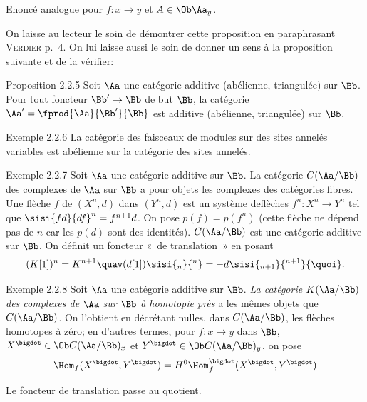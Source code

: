 \documentclass[10pt]{../fichiers-configuration-latex/smfart}
\begin{document}
Enoncé analogue pour $f:x\rightarrow y$ et $A\in \Ob \Aa_y$.

On laisse au lecteur le soin de démontrer cette proposition en
paraphrasant \textsc{Verdier} \cite{SGA4-17:CD} p.~4. On lui laisse aussi le soin de donner
un sens à la proposition suivante et de la vérifier:

\begin{enonce*}{Proposition 2.2.5}
Soit $\Aa$ une catégorie additive (\resp abélienne, \resp
triangulée) sur $\Bb$. Pour tout foncteur
$\Bb'\rightarrow \Bb$ de but $\Bb$, la
catégorie $\Aa'=\fprod{\Aa}{\Bb'}{\Bb}$ est
additive (\resp abélienne, \resp triangulée) sur $\Bb$.
\end{enonce*}

\begin{enonce*}[remark]{Exemple 2.2.6}
La catégorie des faisceaux de modules sur des sites annelés variables
est abélienne sur la catégorie des sites annelés.
\end{enonce*}

\begin{enonce*}[remark]{Exemple 2.2.7}
Soit $\Aa$ une catégorie additive sur $\Bb$. La
catégorie $C(\Aa/\Bb)$ des complexes de $\Aa$
sur $\Bb$ a pour objets les complexes des catégories
fibres. Une flèche $f$ de $(X^n,d)$ dans $(Y^n,d)$ est un système
de\pageoriginale flèches $f^{n}:X^{n}\rightarrow Y^{n}$ tel que
$\sisi{fd}{df}^{n}=f^{n+1} d$. On pose $p(f)=p(f^{n})$ (cette flèche ne dépend
pas de $n$ car les $p(d)$ sont des
identités). $C(\Aa/\Bb)$ est une catégorie additive
sur $\Bb$. On définit un foncteur « de translation »  en posant
\[
(K[1])^{n}=K^{n+1}\quav (d[1])\sisi{_n}{^n}=-d\sisi{_{n+1}}{^{n+1}}{\quoi}.
\]
\end{enonce*}

\begin{enonce*}[remark]{Exemple 2.2.8}
Soit $\Aa$ une catégorie additive sur $\Bb$. \emph{La
catégorie $K(\Aa/\Bb)$ des complexes de $\Aa$
sur $\Bb$ à homotopie près} a les mêmes objets que
$C(\Aa/\Bb)$. On l'obtient en décrétant nulles, dans
$C(\Aa/\Bb)$, les flèches homotopes à zéro; en
d'autres termes, pour $f:x\rightarrow y$ dans $\Bb$,
$X^{\bigdot}\in \Ob C(\Aa/\Bb)_x$ et $Y^{\bigdot}\in
\Ob C(\Aa/\Bb)_y$, on pose
\[
\Hom_f(X^{\bigdot},
Y^{\bigdot})=H^{0}\Hom^{\bigdot}_f(X^{\bigdot},Y^{\bigdot})
\]
\end{enonce*}

Le foncteur de translation passe au quotient.
\end{document}
